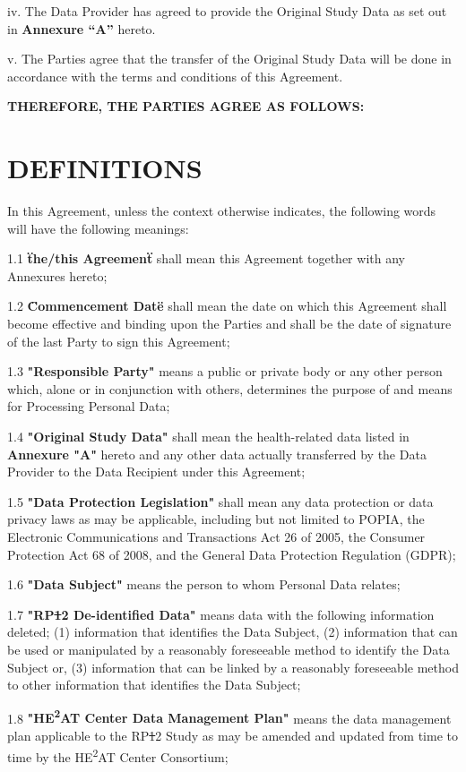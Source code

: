 \documentclass[12pt,letterpaper]{article}
\newcommand{\deleted}[1]{\textcolor{deletecolor}{\sout{#1}}}
\newcommand{\added}[1]{\textcolor{addcolor}{#1}}
\begin{document}
iv. The Data Provider has agreed to provide the Original Study Data as set out in \textbf{Annexure ``A''} hereto.

v. The Parties agree that the transfer of the Original Study Data will be done in accordance with the terms and conditions of this Agreement.

\textbf{THEREFORE, THE PARTIES AGREE AS FOLLOWS:}

\section{DEFINITIONS}

In this Agreement, unless the context otherwise indicates, the following words will have the following meanings:

1.1 \textbf{\"the/this Agreement\"} shall mean this Agreement together with any Annexures hereto;

1.2 \textbf{\"Commencement Date\"} shall mean the date on which this Agreement shall become effective and binding upon the Parties and shall be the date of signature of the last Party to sign this Agreement;

1.3 \textbf{"Responsible Party"} means a public or private body or any other person which, alone or in conjunction with others, determines the purpose of and means for Processing Personal Data;

1.4 \textbf{"Original Study Data"} shall mean the health-related data listed in \textbf{Annexure "A"} hereto and any other data actually transferred by the Data Provider to the Data Recipient under this Agreement;

1.5 \textbf{"Data Protection Legislation"} shall mean any data protection or data privacy laws as may be applicable, including but not limited to POPIA, the Electronic Communications and Transactions Act 26 of 2005, the Consumer Protection Act 68 of 2008, and the General Data Protection Regulation (GDPR);

1.6 \textbf{"Data Subject"} means the person to whom Personal Data relates;

1.7 \textbf{"RP\deleted{1}\added{2} De-identified Data"} means data with the following information deleted; (1) information that identifies the Data Subject, (2) information that can be used or manipulated by a reasonably foreseeable method to identify the Data Subject or, (3) information that can be linked by a reasonably foreseeable method to other information that identifies the Data Subject;

1.8 \textbf{"HE\textsuperscript{2}AT Center Data Management Plan"} means the data management plan applicable to the RP\deleted{1}\added{2} Study as may be amended and updated from time to time by the HE\textsuperscript{2}AT Center Consortium;
\end{document}
